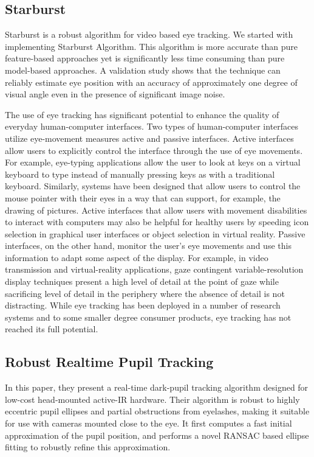  


\subsection{Starburst}
Starburst is a robust algorithm for video based eye tracking. We started with implementing Starburst Algorithm. This algorithm is more accurate than pure feature-based approaches yet is significantly less time consuming than pure model-based approaches. A validation study shows that the technique can reliably estimate eye position with an accuracy of approximately one degree of visual angle even in the presence of significant image noise. \bigskip

The use of eye tracking has significant potential to enhance the quality of everyday human-computer interfaces. Two types of human-computer interfaces utilize eye-movement measures active and passive interfaces. Active interfaces allow users to explicitly control the interface through the use of eye movements. For example, eye-typing applications allow the user to look at keys on a virtual keyboard to type instead of manually pressing keys as with a traditional keyboard. Similarly, systems have been designed that allow users to control the mouse pointer with their eyes in a way that can support, for example, the drawing of pictures. Active interfaces that allow users with movement disabilities to interact with computers may also be helpful for healthy users by speeding icon selection in graphical user interfaces or object selection in virtual reality. Passive interfaces, on the other hand, monitor the user's eye movements and use this information to adapt some aspect of the display. For example, in video transmission and virtual-reality applications, gaze contingent variable-resolution display techniques present a high level of detail at the point of gaze while sacrificing level of detail in the periphery where the absence of detail is not distracting. While eye tracking has been deployed in a number of research systems and to some smaller degree consumer products, eye tracking has not reached its full potential.

\subsection{Robust Realtime Pupil Tracking}
In this paper, they present a real-time dark-pupil tracking algorithm designed for low-cost head-mounted active-IR hardware. Their algorithm is robust to highly eccentric pupil ellipses and partial obstructions from eyelashes, making it suitable for use with cameras mounted close to the eye. It first computes a fast initial approximation of the pupil position, and performs a novel RANSAC based ellipse fitting to robustly refine this approximation.

